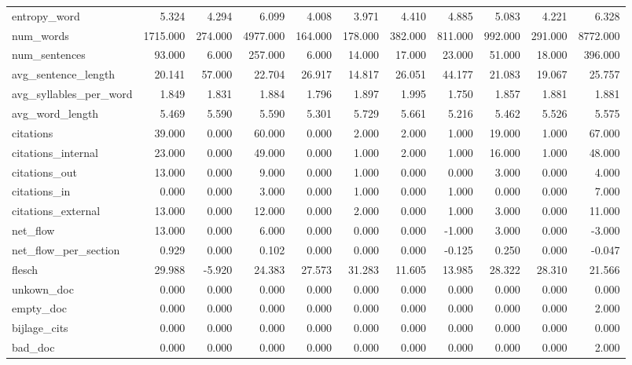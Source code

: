 \begin{tabular}{lrrrrrrrrrr}
\cline{1-11}
entropy\_word & 5.324 & 4.294 & 6.099 & 4.008 & 3.971 & 4.410 & 4.885 & 5.083 & 4.221 & 6.328 \\
\cline{1-11}
num\_words & 1715.000 & 274.000 & 4977.000 & 164.000 & 178.000 & 382.000 & 811.000 & 992.000 & 291.000 & 8772.000 \\
\cline{1-11}
num\_sentences & 93.000 & 6.000 & 257.000 & 6.000 & 14.000 & 17.000 & 23.000 & 51.000 & 18.000 & 396.000 \\
\cline{1-11}
avg\_sentence\_length & 20.141 & 57.000 & 22.704 & 26.917 & 14.817 & 26.051 & 44.177 & 21.083 & 19.067 & 25.757 \\
\cline{1-11}
avg\_syllables\_per\_word & 1.849 & 1.831 & 1.884 & 1.796 & 1.897 & 1.995 & 1.750 & 1.857 & 1.881 & 1.881 \\
\cline{1-11}
avg\_word\_length & 5.469 & 5.590 & 5.590 & 5.301 & 5.729 & 5.661 & 5.216 & 5.462 & 5.526 & 5.575 \\
\cline{1-11}
citations & 39.000 & 0.000 & 60.000 & 0.000 & 2.000 & 2.000 & 1.000 & 19.000 & 1.000 & 67.000 \\
\cline{1-11}
citations\_internal & 23.000 & 0.000 & 49.000 & 0.000 & 1.000 & 2.000 & 1.000 & 16.000 & 1.000 & 48.000 \\
\cline{1-11}
citations\_out & 13.000 & 0.000 & 9.000 & 0.000 & 1.000 & 0.000 & 0.000 & 3.000 & 0.000 & 4.000 \\
\cline{1-11}
citations\_in & 0.000 & 0.000 & 3.000 & 0.000 & 1.000 & 0.000 & 1.000 & 0.000 & 0.000 & 7.000 \\
\cline{1-11}
citations\_external & 13.000 & 0.000 & 12.000 & 0.000 & 2.000 & 0.000 & 1.000 & 3.000 & 0.000 & 11.000 \\
\cline{1-11}
net\_flow & 13.000 & 0.000 & 6.000 & 0.000 & 0.000 & 0.000 & -1.000 & 3.000 & 0.000 & -3.000 \\
\cline{1-11}
net\_flow\_per\_section & 0.929 & 0.000 & 0.102 & 0.000 & 0.000 & 0.000 & -0.125 & 0.250 & 0.000 & -0.047 \\
\cline{1-11}
flesch & 29.988 & -5.920 & 24.383 & 27.573 & 31.283 & 11.605 & 13.985 & 28.322 & 28.310 & 21.566 \\
\cline{1-11}
unkown\_doc & 0.000 & 0.000 & 0.000 & 0.000 & 0.000 & 0.000 & 0.000 & 0.000 & 0.000 & 0.000 \\
\cline{1-11}
empty\_doc & 0.000 & 0.000 & 0.000 & 0.000 & 0.000 & 0.000 & 0.000 & 0.000 & 0.000 & 2.000 \\
\cline{1-11}
bijlage\_cits & 0.000 & 0.000 & 0.000 & 0.000 & 0.000 & 0.000 & 0.000 & 0.000 & 0.000 & 0.000 \\
\cline{1-11}
bad\_doc & 0.000 & 0.000 & 0.000 & 0.000 & 0.000 & 0.000 & 0.000 & 0.000 & 0.000 & 2.000 \\
\cline{1-11}
\bottomrule
\end{tabular}
